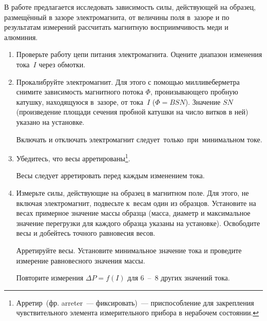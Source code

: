 \begin{lab:task}

В работе предлагается исследовать зависимость силы, действующей на образец, размещённый в зазоре электромагнита, от
величины поля в~зазоре и по результатам измерений рассчитать магнитную восприимчивость меди и алюминия.

\begin{enumerate}


\item Проверьте работу цепи питания электромагнита. Оцените диапазон изменения тока~$I$ через обмотки.

\item Прокалибруйте электромагнит. Для этого с помощью милливеберметра снимите зависимость магнитного потока $\Phi$,
пронизывающего пробную катушку, находящуюся в~зазоре, от тока~$I$ ($\Phi=BSN$). Значение $SN$ (произведение площади
сечения пробной катушки на число витков в ней) указано на установке.

\begin{lab:warning}
	Включать и отключать электромагнит следует~только~при~минимальном токе.
\end{lab:warning}

\item Убедитесь, что весы арретированы\footnote{Арретир~(фр. arreter~--- фиксировать)~--- приспособление для закрепления
чувствительного элемента измерительного прибора в нерабочем состоянии.}.

\begin{lab:warning}
	Весы следует арретировать перед каждым изменением тока.
\end{lab:warning}

\item \label{item:4} Измерьте силы, действующие на образец в магнитном поле. Для этого, не включая электромагнит, подвесьте к~весам
один из образцов. Установите на весах примерное значение массы образца (масса, диаметр и максимальное значение
перегрузки для каждого образца указаны на установке). Освободите весы и добейтесь точного равновесия весов.

Арретируйте весы. Установите минимальное значение тока и проведите измерение равновесного значения массы.

Повторите измерения $\Delta P = f(I)$ для 6~--~8 других значений тока.


\end{enumerate}
\end{lab:task}
